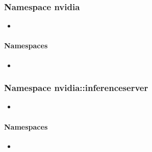 \documentclass[letterpaper,10pt,english]{sphinxmanual}
\begin{document}
\subsubsection{Namespace nvidia}
\label{\detokenize{cpp_api/namespace_nvidia:namespace-nvidia}}\label{\detokenize{cpp_api/namespace_nvidia:id1}}\label{\detokenize{cpp_api/namespace_nvidia::doc}}
\begin{sphinxShadowBox}
\begin{itemize}
\item {} 
\label{\detokenize{cpp_api/namespace_nvidia:id2}}{\hyperref[\detokenize{cpp_api/namespace_nvidia:namespaces}]{}}

\end{itemize}
\end{sphinxShadowBox}


\paragraph{Namespaces}
\label{\detokenize{cpp_api/namespace_nvidia:namespaces}}\begin{itemize}
\item {} 
{\hyperref[\detokenize{cpp_api/namespace_nvidia__inferenceserver:namespace-nvidia-inferenceserver}]{}}

\end{itemize}


\subsubsection{Namespace nvidia::inferenceserver}
\label{\detokenize{cpp_api/namespace_nvidia__inferenceserver:namespace-nvidia-inferenceserver}}\label{\detokenize{cpp_api/namespace_nvidia__inferenceserver:id1}}\label{\detokenize{cpp_api/namespace_nvidia__inferenceserver::doc}}
\begin{sphinxShadowBox}
\begin{itemize}
\item {} 
\label{\detokenize{cpp_api/namespace_nvidia__inferenceserver:id2}}{\hyperref[\detokenize{cpp_api/namespace_nvidia__inferenceserver:namespaces}]{}}

\end{itemize}
\end{sphinxShadowBox}


\paragraph{Namespaces}
\label{\detokenize{cpp_api/namespace_nvidia__inferenceserver:namespaces}}\begin{itemize}
\item {} 
{\hyperref[\detokenize{cpp_api/namespace_nvidia__inferenceserver__client:namespace-nvidia-inferenceserver-client}]{}}

\end{itemize}
\end{document}
